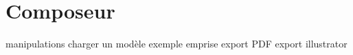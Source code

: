 \section{Composeur}\label{sec:} 
        manipulations
        charger un modèle exemple
        emprise
        export PDF
        export illustrator